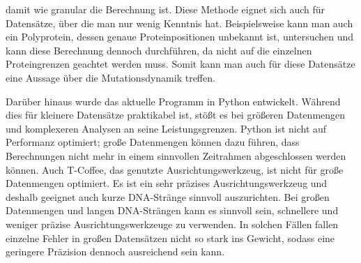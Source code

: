 \documentclass[german,version-2022-01]{uzl-thesis}
\begin{document}
damit wie granular die Berechnung ist. Diese Methode eignet sich auch f\"ur Datens\"atze, \"uber die man nur wenig Kenntnis hat. Beispielsweise kann man auch ein Polyprotein, dessen genaue Proteinpositionen unbekannt ist, untersuchen und kann diese Berechnung dennoch durchf\"uhren, da nicht auf die einzelnen Proteingrenzen geachtet werden muss. Somit kann man auch f\"ur diese Datens\"atze eine Aussage \"uber die Mutationsdynamik treffen.  

Dar\"uber hinaus wurde das aktuelle Programm in Python entwickelt. W\"ahrend dies f\"ur kleinere Datens\"atze praktikabel ist, st\"o\ss{}t es bei gr\"o\ss{}eren Datenmengen und komplexeren Analysen an seine Leistungsgrenzen. Python ist nicht auf Performanz optimiert; gro\ss{}e Datenmengen k\"onnen dazu f\"uhren, dass Berechnungen nicht mehr in einem sinnvollen Zeitrahmen abgeschlossen werden k\"onnen. Auch T-Coffee, das genutzte Ausrichtungswerkzeug, ist nicht f\"ur gro\ss{}e Datenmengen optimiert. Es ist ein sehr pr\"azises Ausrichtungswerkzeug und deshalb geeignet auch kurze DNA-Str\"ange sinnvoll auszurichten. Bei gro\ss{}en Datenmengen und langen DNA-Str\"angen kann es sinnvoll sein, schnellere und weniger pr\"azise Ausrichtungswerkzeuge zu verwenden. In solchen F\"allen fallen einzelne Fehler in gro\ss{}en Datens\"atzen nicht so stark ins Gewicht, sodass eine geringere Pr\"azision dennoch ausreichend sein kann.
\end{document}
